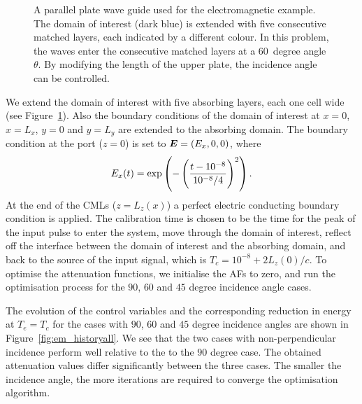 \documentclass[a4paper]{article}
\renewcommand{\vec}{\boldsymbol}
\begin{document}
\begin{figure}
  \centering
  \caption{A  parallel plate wave guide used for the
    electromagnetic example. The domain of interest (dark blue) is
    extended with five consecutive matched layers, each indicated by a
    different colour. In this problem, the waves enter the consecutive matched
    layers at a $60$~degree angle $\theta$. By modifying the length of
    the upper plate, the incidence angle can be controlled.}
  \label{fig:em_domain60}
\end{figure}

We extend the domain of interest with five absorbing layers, each one
cell wide (see Figure~\ref{fig:em_domain60}). Also the boundary
conditions of the domain of interest at $x=0$, $x=L_x$, $y=0$ and
$y=L_y$ are extended to the absorbing domain. The boundary condition
at the port ($z = 0 $) is set to $\vec{E} = \del{E_x, 0, 0}$, where
\begin{equation}
  E_x(t) = \exp\del{-\del{\frac{t - 10^{-8}}{10^{-8}/4}}^2}.
\end{equation}
At the end of the CMLs ($z = L_{z}(x)$) a perfect electric conducting
boundary condition is applied. The calibration time is chosen to be
the time for the peak of the input pulse to enter the system, move
through the domain of interest, reflect off the interface between the
domain of interest and the absorbing domain, and back to the source of
the input signal, which is $T_{c} = 10^{-8} + 2 L_{z}(0)/c$. To
optimise the attenuation functions, we initialise the AFs to zero, and
run the optimisation process for the $90$, $60$ and $45$ degree
incidence angle cases.

The evolution of the control variables and the corresponding reduction
in energy at $T_{e}=T_{c}$ for the cases with $90$, $60$ and $45$
degree incidence angles are shown in
Figure~\ref{fig:em_historyall}. We see that the two cases with
non-perpendicular incidence perform well relative to the to the $90$
degree case. The obtained attenuation values differ significantly
between the three cases. The smaller the incidence angle, the more
iterations are required to converge the optimisation algorithm.
\end{document}
